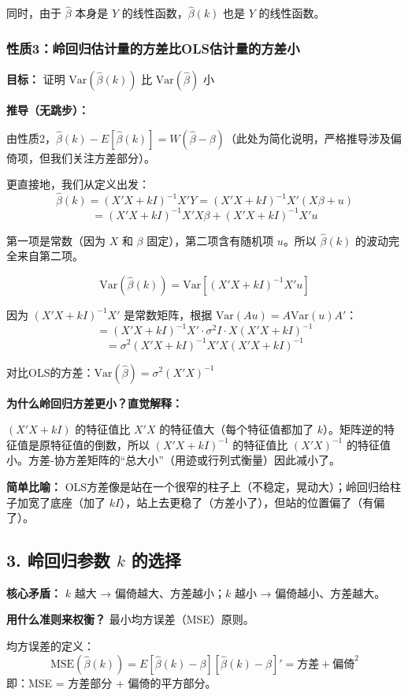 \documentclass[12pt,a4paper]{ctexart}
\begin{document}
同时，由于 $\hat{\beta}$ 本身是 $Y$ 的线性函数，$\hat{\beta}(k)$ 也是 $Y$ 的线性函数。

\subsubsection{性质3：岭回归估计量的方差比OLS估计量的方差小}

\textbf{目标：} 证明 $\text{Var}(\hat{\beta}(k))$ 比 $\text{Var}(\hat{\beta})$ 小

\textbf{推导（无跳步）：}

由性质2，$\hat{\beta}(k) - E[\hat{\beta}(k)] = W(\hat{\beta} - \beta)$（此处为简化说明，严格推导涉及偏倚项，但我们关注方差部分）。

更直接地，我们从定义出发：
\[
\hat{\beta}(k) = (X'X + kI)^{-1}X'Y = (X'X + kI)^{-1}X'(X\beta + u)
\]
\[
= (X'X + kI)^{-1}X'X\beta + (X'X + kI)^{-1}X'u
\]

第一项是常数（因为 $X$ 和 $\beta$ 固定），第二项含有随机项 $u$。所以 $\hat{\beta}(k)$ 的波动完全来自第二项。

\[
\text{Var}(\hat{\beta}(k)) = \text{Var}[(X'X + kI)^{-1}X'u]
\]

因为 $(X'X + kI)^{-1}X'$ 是常数矩阵，根据 $\text{Var}(Au) = A\text{Var}(u)A'$：
\[
= (X'X + kI)^{-1}X' \cdot \sigma^2 I \cdot X(X'X + kI)^{-1}
\]
\[
= \sigma^2(X'X + kI)^{-1}X'X(X'X + kI)^{-1}
\]

对比OLS的方差：$\text{Var}(\hat{\beta}) = \sigma^2(X'X)^{-1}$

\textbf{为什么岭回归方差更小？直觉解释：}

$(X'X + kI)$ 的特征值比 $X'X$ 的特征值大（每个特征值都加了 $k$）。矩阵逆的特征值是原特征值的倒数，所以 $(X'X + kI)^{-1}$ 的特征值比 $(X'X)^{-1}$ 的特征值小。方差-协方差矩阵的“总大小”（用迹或行列式衡量）因此减小了。

\textbf{简单比喻：} OLS方差像是站在一个很窄的柱子上（不稳定，晃动大）；岭回归给柱子加宽了底座（加了 $kI$），站上去更稳了（方差小了），但站的位置偏了（有偏了）。

\subsection{3. 岭回归参数 $k$ 的选择}

\textbf{核心矛盾：} $k$ 越大 → 偏倚越大、方差越小；$k$ 越小 → 偏倚越小、方差越大。

\textbf{用什么准则来权衡？} 最小均方误差（MSE）原则。

均方误差的定义：
\[
\text{MSE}(\hat{\beta}(k)) = E[\hat{\beta}(k) - \beta][\hat{\beta}(k) - \beta]' = \text{方差} + \text{偏倚}^2
\]
即：MSE = 方差部分 + 偏倚的平方部分。
\end{document}
